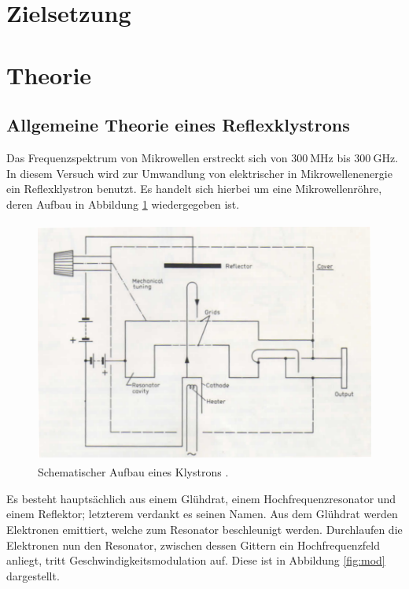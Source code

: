 \section{Zielsetzung}


\section{Theorie}
\label{sec:Theorie}
\subsection{Allgemeine Theorie eines Reflexklystrons}

Das Frequenzspektrum von Mikrowellen erstreckt sich von $\SI{300}{\mega\hertz}$ bis $\SI{300}{\giga\hertz}$.
In diesem Versuch wird zur Umwandlung von elektrischer in Mikrowellenenergie ein Reflexklystron benutzt.
Es handelt sich hierbei um eine Mikrowellenröhre, deren Aufbau in Abbildung \ref{fig:klystron} wiedergegeben ist.

\begin{figure}
  \centering
  \includegraphics[height=8cm]{ressources/theorie.png}
  \caption{Schematischer Aufbau eines Klystrons \cite{skript}.}
  \label{fig:klystron}
\end{figure}

Es besteht hauptsächlich aus einem Glühdrat, einem Hochfrequenzresonator und einem Reflektor; letzterem verdankt es seinen Namen.
Aus dem Glühdrat werden Elektronen emittiert, welche zum Resonator beschleunigt werden.
Durchlaufen die Elektronen nun den Resonator, zwischen dessen Gittern ein Hochfrequenzfeld anliegt, tritt Geschwindigkeitsmodulation auf.
Diese ist in Abbildung \ref{fig:mod} dargestellt.

